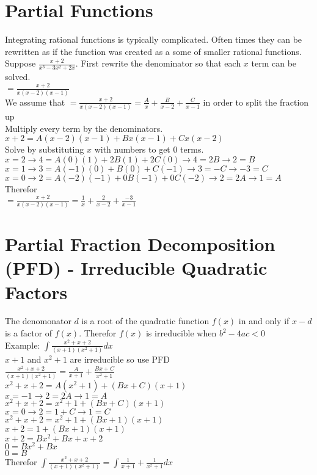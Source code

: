 \documentclass{article}
\begin{document}
\section{Partial Functions}
Integrating rational functions is typically complicated. Often times they can be rewritten as if the function was created as a some of smaller rational functions. Suppose $\frac{x+2}{x^3 -3x^2 +2x}$. First rewrite the denominator so that each $x$ term can be solved.\\
$=\frac{x+2}{x(x-2)(x-1)}$\\
We assume that $=\frac{x+2}{x(x-2)(x-1)} = \frac{A}{x} + \frac{B}{x-2} + \frac{C}{x-1}$ in order to split the fraction up\\
Multiply every term by the denominators. $x+2 = A(x-2)(x-1) + Bx(x-1) + Cx(x-2)$\\
Solve by substituting $x$ with numbers to get 0 terms.\\
$x=2 \to 4 = A(0)(1) + 2B(1) + 2C(0) \to 4 = 2B \to 2 = B$\\
$x=1 \to 3 = A(-1)(0) + B(0) + C(-1) \to 3 = -C \to -3 = C$\\
$x=0 \to 2 = A(-2)(-1) + 0B(-1) + 0C(-2) \to 2 = 2A \to 1 = A$\\
Therefor\\
$=\frac{x+2}{x(x-2)(x-1)} = \frac{1}{x} + \frac{2}{x-2} + \frac{-3}{x-1}$\\

\section{Partial Fraction Decomposition (PFD) - Irreducible Quadratic Factors}
The denomonator $d$ is a root of the quadratic function $f(x)$ in and only if $x-d$ is a factor of $f(x)$. Therefor $f(x)$ is irreducible when $b^2 - 4ac < 0$\\
Example: $\int{\frac{x^2 + x + 2}{(x + 1)(x^2 + 1)}}dx$\\
$x + 1$ and $x^2 + 1$ are irreducible so use PFD\\
$\frac{x^2 + x + 2}{(x + 1)(x^2 + 1)} = \frac{A}{x+1} + \frac{Bx + C}{x^2 + 1}$\\
$x^2 + x + 2 = A(x^2 + 1) + (Bx + C)(x + 1)$\\
$x = -1 \to 2 = 2A \to 1 = A$\\
$x^2 + x + 2 = x^2 + 1 + (Bx + C)(x + 1)$\\
$x = 0 \to 2 = 1 + C \to 1 = C$\\
$x^2 + x + 2 = x^2 + 1 + (Bx + 1)(x + 1)$\\
$x + 2 = 1 + (Bx + 1)(x + 1)$\\
$x + 2 = Bx^2 + Bx + x + 2$\\
$0 = Bx^2 + Bx$\\
$0 = B$\\
Therefor $\int{\frac{x^2 + x + 2}{(x + 1)(x^2 + 1)}} = \int{\frac{1}{x + 1} + \frac{1}{x^2 + 1}}dx$\\
\end{document}
